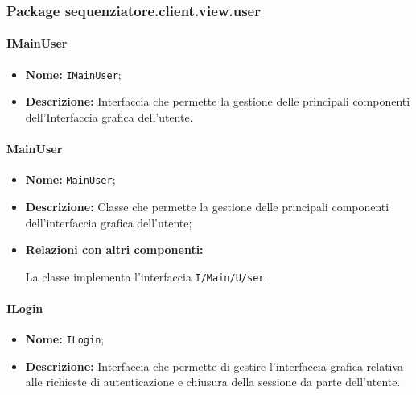 \subsubsection{Package sequenziatore.client.view.user}

\paragraph{IMainUser}
\begin{itemize}
\item \textbf{Nome:} \texttt{IMainUser};
\item \textbf{Descrizione:} Interfaccia che permette la gestione delle principali componenti dell'Interfaccia grafica dell'utente.
\end{itemize}

\paragraph{MainUser}
\begin{flushleft}
\begin{itemize}
\item \textbf{Nome:} \texttt{MainUser};
\item \textbf{Descrizione:} Classe che permette la gestione delle principali componenti dell'interfaccia grafica dell'utente;
\item \textbf{Relazioni con altri componenti:}
\begin{sloppypar}
La classe implementa l'interfaccia \texttt{I\fshyp{}Main\fshyp{}U\fshyp{}ser}.
\end{sloppypar}
\end{itemize}
\end{flushleft}

\paragraph{ILogin}
\begin{itemize}
\item \textbf{Nome:} \texttt{ILogin};
\item \textbf{Descrizione:} Interfaccia che permette di gestire l'interfaccia grafica relativa alle richieste di autenticazione e chiusura della sessione da parte dell'utente.
\end{itemize}

